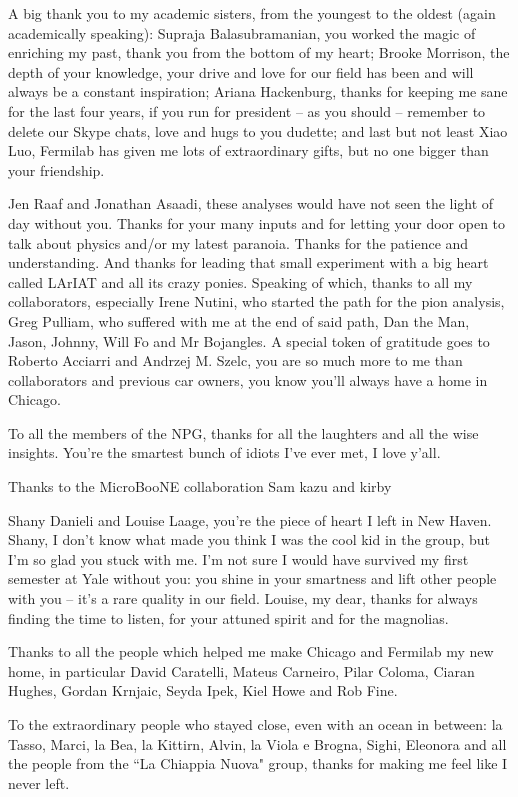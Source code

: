 \documentclass[letterpaper,12pt]{yalephd}
\begin{document}
A big thank you to my academic sisters, from the youngest to the oldest (again academically speaking): Supraja Balasubramanian, you worked the magic of enriching my past, thank you from the bottom of my heart;  Brooke Morrison, the depth of your knowledge, your drive and love for our field has been and will always be a constant inspiration;  Ariana  Hackenburg, thanks for keeping me sane for the last four years, if you run for president -- as you should -- remember to delete our Skype chats, love and hugs to you dudette; and last but not least Xiao Luo, Fermilab has given me lots of extraordinary gifts, but no one  bigger than your friendship. 

Jen Raaf and Jonathan Asaadi, these analyses would have not seen the light of day without you. Thanks for your many inputs and for letting your door open to talk about physics and/or my latest paranoia. Thanks for the patience and understanding. And thanks for leading that small experiment with a big heart called LArIAT and all its crazy ponies. Speaking of which, thanks to all my collaborators, especially Irene Nutini, who started the path for the pion analysis, Greg Pulliam, who suffered with me at the end of said path, Dan the Man, Jason, Johnny, Will Fo and Mr Bojangles. A special token of gratitude goes to Roberto Acciarri and Andrzej M. Szelc, you are so much more to me than collaborators and previous car owners, you know you'll always have a home in Chicago.

To all the members of the NPG, thanks for all the laughters and all the wise insights. You're the smartest bunch of idiots I've ever met, I love y'all.

Thanks to the MicroBooNE collaboration Sam kazu and kirby

Shany Danieli and Louise Laage, you're the piece of heart I left in New Haven. Shany, I don't know what made you think I was the cool kid in the group, but I'm so glad you stuck with me. I'm not sure I would have survived my first semester at Yale without you: you shine in your smartness and lift other people with you -- it's a rare quality in our field. Louise, my dear, thanks for always finding the time to listen, for your attuned spirit and for the magnolias.

Thanks to all the people which helped me make Chicago and Fermilab my new home, in particular David Caratelli,  Mateus Carneiro, Pilar Coloma, Ciaran Hughes, Gordan Krnjaic, Seyda Ipek, Kiel Howe and Rob Fine.

To the extraordinary people who stayed close, even with an ocean in between: la Tasso, Marci, la Bea, la Kittirn, Alvin, la Viola e Brogna, Sighi, Eleonora and all the people from the ``La Chiappia Nuova" group, thanks for making me feel like I never left.
\end{document}
